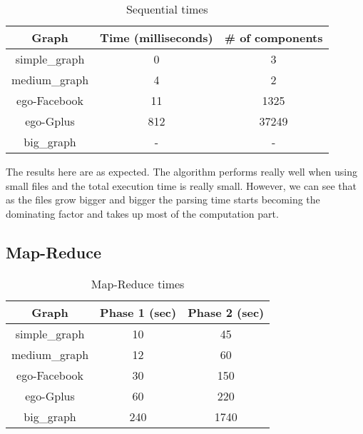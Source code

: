 \begin{table}[!h]
\footnotesize
\begin{center}
\begin{tabular}{|c|c|c|}
\hline
{\bf Graph} & {\bf Time (milliseconds)}& {\bf \# of components} \\
\hline
\hline
simple\_graph   & 0  & 3  \\
\hline
medium\_graph   & 4  & 2   \\
\hline
ego-Facebook   & 11  & 1325  \\
\hline
ego-Gplus   & 812 & 37249 \\
\hline
big\_graph   & -  & -  \\
\hline
\end{tabular}
\caption{Sequential times}
\label{tb:sequentialtimes}
\end{center}
\end{table}

The results here are as expected. The algorithm performs really well when using small files and the total execution time is really small. However, we can see that as the files grow bigger and bigger the parsing time starts becoming the dominating factor and takes up most of the computation part.

\subsection{Map-Reduce}

\begin{table}[h!]
\scriptsize
\begin{center}
\begin{tabular}{|c|c|c|}
\hline
{\bf Graph} & {\bf Phase 1 (sec)} & {\bf Phase 2 (sec)}\\
\hline
\hline
simple\_graph   & 10  & 45 \\
\hline
medium\_graph   & 12 & 60 \\
\hline
ego-Facebook   & 30 & 150 \\
\hline
ego-Gplus   & 60  & 220 \\
\hline
big\_graph   & 240 & 1740 \\
\hline
\end{tabular}
\caption{Map-Reduce times}
\label{tb:MapReducetimes}
\end{center}
\end{table}
